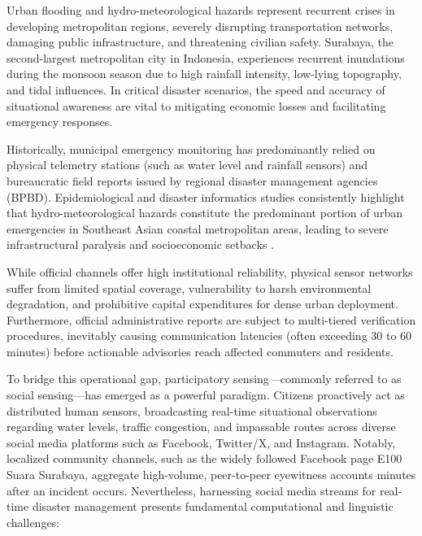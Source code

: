 \documentclass[conference]{IEEEtran}
\begin{document}
Urban flooding and hydro-meteorological hazards represent recurrent crises in developing metropolitan regions, severely disrupting transportation networks, damaging public infrastructure, and threatening civilian safety. Surabaya, the second-largest metropolitan city in Indonesia, experiences recurrent inundations during the monsoon season due to high rainfall intensity, low-lying topography, and tidal influences. In critical disaster scenarios, the speed and accuracy of situational awareness are vital to mitigating economic losses and facilitating emergency responses.

Historically, municipal emergency monitoring has predominantly relied on physical telemetry stations (such as water level and rainfall sensors) and bureaucratic field reports issued by regional disaster management agencies (BPBD). Epidemiological and disaster informatics studies consistently highlight that hydro-meteorological hazards constitute the predominant portion of urban emergencies in Southeast Asian coastal metropolitan areas, leading to severe infrastructural paralysis and socioeconomic setbacks \cite{holderness2015petajakarta,imran2020crosslingual}.

While official channels offer high institutional reliability, physical sensor networks suffer from limited spatial coverage, vulnerability to harsh environmental degradation, and prohibitive capital expenditures for dense urban deployment. Furthermore, official administrative reports are subject to multi-tiered verification procedures, inevitably causing communication latencies (often exceeding 30 to 60 minutes) before actionable advisories reach affected commuters and residents.

To bridge this operational gap, participatory sensing—commonly referred to as social sensing—has emerged as a powerful paradigm. Citizens proactively act as distributed human sensors, broadcasting real-time situational observations regarding water levels, traffic congestion, and impassable routes across diverse social media platforms such as Facebook, Twitter/X, and Instagram. Notably, localized community channels, such as the widely followed Facebook page E100 Suara Surabaya, aggregate high-volume, peer-to-peer eyewitness accounts minutes after an incident occurs. Nevertheless, harnessing social media streams for real-time disaster management presents fundamental computational and linguistic challenges:
\end{document}
